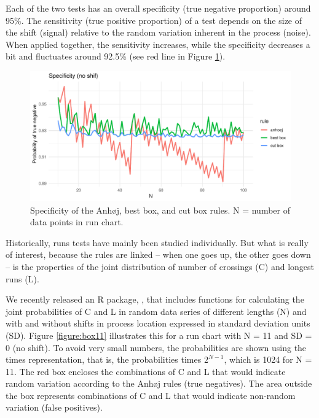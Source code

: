 Each of the two tests has an overall specificity (true negative
proportion) around 95\%. The sensitivity (true positive proportion) of a
test depends on the size of the shift (signal) relative to the random
variation inherent in the process (noise). When applied together, the
sensitivity increases, while the specificity decreases a bit and
fluctuates around 92.5\% (see red line in Figure \ref{figure:spec}).

\begin{figure}[htbp]
  \centering
  \includegraphics[width=\textwidth]{fig_spec.pdf}
  \caption{Specificity of the Anhøj, best box, and cut box rules. N = number of data points in run chart. }
  \label{figure:spec}
\end{figure}

Historically, runs tests have mainly been studied individually. But what
is really of interest, because the rules are linked -- when one goes up,
the other goes down -- is the properties of the joint distribution of
number of crossings (C) and longest runs (L).

We recently released an R package,  \citep{twl2018},
that includes functions for calculating the joint probabilities of C and
L in random data series of different lengths (N) and with and without
shifts in process location expressed in standard deviation units (SD).
Figure \ref{figure:box11} illustrates this for a run chart with N = 11
and SD = 0 (no shift). To avoid very small numbers, the probabilities
are shown using the times representation, that is, the probabilities
times \(2^{N-1}\), which is 1024 for N = 11. The red box encloses the
combinations of C and L that would indicate random variation according
to the Anhøj rules (true negatives). The area outside the box represents
combinations of C and L that would indicate non-random variation (false
positives).

